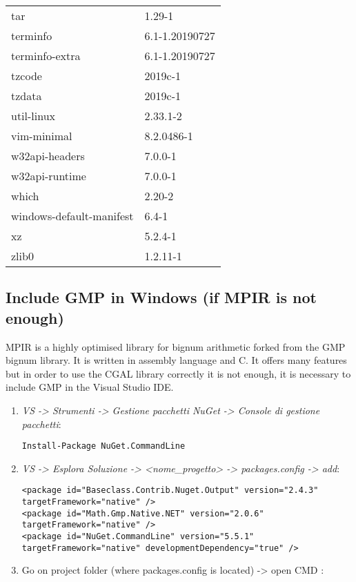 \documentclass[10pt, english, openany]{report}
\begin{document}
\begin{appendices}
\begin{center}
\begin{tabular}{|m{3cm}|m{3cm}|}
tar & 1.29-1 \\
terminfo & 6.1-1.20190727 \\
terminfo-extra & 6.1-1.20190727 \\
tzcode & 2019c-1 \\
tzdata & 2019c-1 \\
util-linux & 2.33.1-2 \\
vim-minimal & 8.2.0486-1 \\
w32api-headers & 7.0.0-1 \\
w32api-runtime & 7.0.0-1 \\
which & 2.20-2 \\
windows-default-manifest & 6.4-1 \\
xz & 5.2.4-1 \\
zlib0 & 1.2.11-1 \\
\hline
\end{tabular}
\end{center}

\subsection{Include GMP in Windows (if MPIR is not enough)}
MPIR is a highly optimised library for bignum arithmetic forked from the GMP bignum library. It is written in assembly language and C. It offers many features but in order to use the CGAL library correctly it is not enough, it is necessary to include GMP in the Visual Studio IDE.
\begin{enumerate}
\item \textit{VS -> Strumenti -> Gestione pacchetti NuGet -> Console di gestione pacchetti}:
	
\begin{lstlisting}
Install-Package NuGet.CommandLine
\end{lstlisting}	

\item \textit{VS -> Esplora Soluzione -> <nome\_progetto> -> packages.config -> add}: 

\begin{lstlisting}
<package id="Baseclass.Contrib.Nuget.Output" version="2.4.3" targetFramework="native" />
<package id="Math.Gmp.Native.NET" version="2.0.6" targetFramework="native" />
<package id="NuGet.CommandLine" version="5.5.1" targetFramework="native" developmentDependency="true" />
\end{lstlisting}
		

\item Go on project folder (where packages.config is located) -> open CMD :


\end{enumerate}
\end{appendices}
\end{document}
